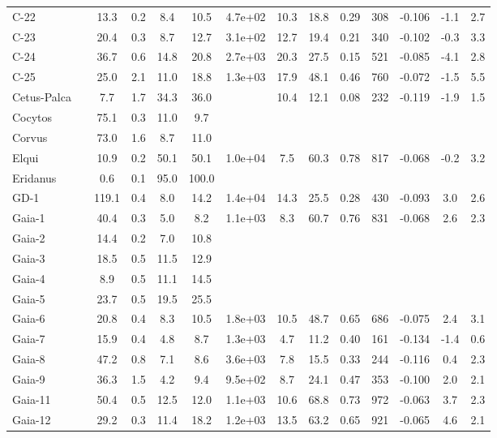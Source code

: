 \begin{tabular}{llSSSSSSSSrSSS}
C-22 &  & 13.3 & 0.2 & 8.4 & 10.5 & 4.7e+02 & 10.3 & 18.8 & 0.29 & 308 & -0.106 & -1.1 & 2.7 \\
C-23 &  & 20.4 & 0.3 & 8.7 & 12.7 & 3.1e+02 & 12.7 & 19.4 & 0.21 & 340 & -0.102 & -0.3 & 3.3 \\
C-24 &  & 36.7 & 0.6 & 14.8 & 20.8 & 2.7e+03 & 20.3 & 27.5 & 0.15 & 521 & -0.085 & -4.1 & 2.8 \\
C-25 &  & 25.0 & 2.1 & 11.0 & 18.8 & 1.3e+03 & 17.9 & 48.1 & 0.46 & 760 & -0.072 & -1.5 & 5.5 \\
Cetus-Palca &  & 7.7 & 1.7 & 34.3 & 36.0 &  & 10.4 & 12.1 & 0.08 & 232 & -0.119 & -1.9 & 1.5 \\
Cocytos &  & 75.1 & 0.3 & 11.0 & 9.7 &  &  &  &  &  &  &  &  \\
Corvus &  & 73.0 & 1.6 & 8.7 & 11.0 &  &  &  &  &  &  &  &  \\
Elqui &  & 10.9 & 0.2 & 50.1 & 50.1 & 1.0e+04 & 7.5 & 60.3 & 0.78 & 817 & -0.068 & -0.2 & 3.2 \\
Eridanus &  & 0.6 & 0.1 & 95.0 & 100.0 &  &  &  &  &  &  &  &  \\
GD-1 &  & 119.1 & 0.4 & 8.0 & 14.2 & 1.4e+04 & 14.3 & 25.5 & 0.28 & 430 & -0.093 & 3.0 & 2.6 \\
Gaia-1 &  & 40.4 & 0.3 & 5.0 & 8.2 & 1.1e+03 & 8.3 & 60.7 & 0.76 & 831 & -0.068 & 2.6 & 2.3 \\
Gaia-2 &  & 14.4 & 0.2 & 7.0 & 10.8 &  &  &  &  &  &  &  &  \\
Gaia-3 &  & 18.5 & 0.5 & 11.5 & 12.9 &  &  &  &  &  &  &  &  \\
Gaia-4 &  & 8.9 & 0.5 & 11.1 & 14.5 &  &  &  &  &  &  &  &  \\
Gaia-5 &  & 23.7 & 0.5 & 19.5 & 25.5 &  &  &  &  &  &  &  &  \\
Gaia-6 &  & 20.8 & 0.4 & 8.3 & 10.5 & 1.8e+03 & 10.5 & 48.7 & 0.65 & 686 & -0.075 & 2.4 & 3.1 \\
Gaia-7 &  & 15.9 & 0.4 & 4.8 & 8.7 & 1.3e+03 & 4.7 & 11.2 & 0.40 & 161 & -0.134 & -1.4 & 0.6 \\
Gaia-8 &  & 47.2 & 0.8 & 7.1 & 8.6 & 3.6e+03 & 7.8 & 15.5 & 0.33 & 244 & -0.116 & 0.4 & 2.3 \\
Gaia-9 &  & 36.3 & 1.5 & 4.2 & 9.4 & 9.5e+02 & 8.7 & 24.1 & 0.47 & 353 & -0.100 & 2.0 & 2.1 \\
Gaia-11 &  & 50.4 & 0.5 & 12.5 & 12.0 & 1.1e+03 & 10.6 & 68.8 & 0.73 & 972 & -0.063 & 3.7 & 2.3 \\
Gaia-12 &  & 29.2 & 0.3 & 11.4 & 18.2 & 1.2e+03 & 13.5 & 63.2 & 0.65 & 921 & -0.065 & 4.6 & 2.1 \\

\end{tabular}
